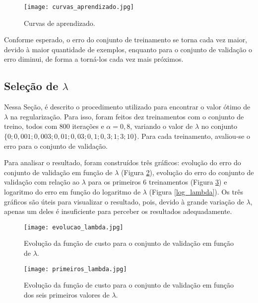 \documentclass[12pt]{article}
\begin{document}
\begin{figure}
\begin{center}
\texttt{[image: curvas\_aprendizado.jpg]}
\caption{Curvas de aprendizado.} \label{curvas_aprendizado}\end{center}
\end{figure}

Conforme esperado, o erro do conjunto de treinamento se torna cada vez maior, devido à maior quantidade de exemplos, enquanto para o conjunto de validação o erro diminui, de forma a torná-los cada vez mais próximos. 

\subsection{Seleção de $\lambda$} \label{lambda_otimo}
Nessa Seção, é descrito o procedimento utilizado para encontrar o valor ótimo de $\lambda$ na regularização. Para isso, foram feitos dez treinamentos com o conjunto de treino, todos com 800 iterações e $\alpha=0,8$, variando o valor de $\lambda$ no conjunto $\{0; 0,001; 0,003; 0,01; 0,03; 0,1; 0,3; 1; 3; 10\}$. Para cada treinamento, avaliou-se o erro para o conjunto de validação.

Para analisar o resultado, foram construídos três gráficos:  evolução do erro do conjunto de validação em função de $\lambda$ (Figura \ref{evolucao_lambda}),  evolução do erro do conjunto de validação com relação ao $\lambda$ para os primeiros 6 treinamentos (Figura \ref{primeiros_lambda}) e logaritmo do erro em função do logaritmo de $\lambda$ (Figura \ref{log_lambda}). Os três gráficos são úteis para visualizar o resultado, pois, devido à grande variação de $\lambda$, apenas um deles é insuficiente para perceber os resultados adequadamente.

\begin{figure}
\begin{center}
\texttt{[image: evolucao\_lambda.jpg]}
\caption{Evolução da função de custo para o conjunto de validação em função de $\lambda$.} \label{evolucao_lambda}
\end{center}
\end{figure}

\begin{figure}
\begin{center}
\texttt{[image: primeiros\_lambda.jpg]}
\caption{Evolução da função de custo para o conjunto de validação em função dos seis primeiros valores de $\lambda$.} \label{primeiros_lambda}
\end{center}
\end{figure}
\end{document}

